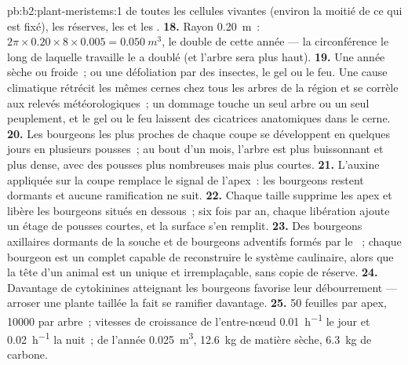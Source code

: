 \begin{solution}{pb:b2:plant-meristems:1}
de toutes les cellules vivantes (environ la moitié de ce qui est fixé),
les réserves, les  et les .
\textbf{18.} Rayon \qty{0.20}{m}~: $2\pi\times 0.20\times 8\times
0.005 = \qty{0.050}{m^3}$, le double de cette année --- la circonférence
le long de laquelle travaille le  a doublé (et l'arbre sera plus
haut).
\textbf{19.} Une année sèche ou froide~; ou une défoliation par des
insectes, le gel ou le feu. Une cause climatique rétrécit les mêmes
cernes chez tous les arbres de la région et se corrèle aux relevés
météorologiques~; un dommage touche un seul arbre ou un seul peuplement,
et le gel ou le feu laissent des cicatrices anatomiques dans le cerne.
\textbf{20.} Les bourgeons les plus proches de chaque coupe se
développent en quelques jours en plusieurs pousses~; au bout d'un mois,
l'arbre est plus buissonnant et plus dense, avec des pousses plus
nombreuses mais plus courtes.
\textbf{21.} L'auxine appliquée sur la coupe remplace le signal de
l'apex~: les bourgeons restent dormants et aucune ramification ne suit.
\textbf{22.} Chaque taille supprime les apex et libère les bourgeons
situés en dessous~; six fois par an, chaque libération ajoute un étage de
pousses courtes, et la surface s'en remplit.
\textbf{23.} Des bourgeons axillaires dormants de la souche et de
bourgeons adventifs formés par le ~; chaque bourgeon est un
 complet capable de reconstruire le système caulinaire, alors
que la tête d'un animal est un  unique et irremplaçable,
sans copie de réserve.
\textbf{24.} Davantage de cytokinines atteignant les bourgeons favorise
leur débourrement --- arroser une plante taillée la fait se ramifier
davantage.
\textbf{25.} 50 feuilles par apex, \num{10000} par arbre~; vitesses de
croissance de l'entre-nœud \qty{0.01}{h^{-1}} le jour et
\qty{0.02}{h^{-1}} la nuit~;  de l'année \qty{0.025}{m^3},
\qty{12.6}{kg} de matière sèche, \qty{6.3}{kg} de carbone.
\end{solution}
